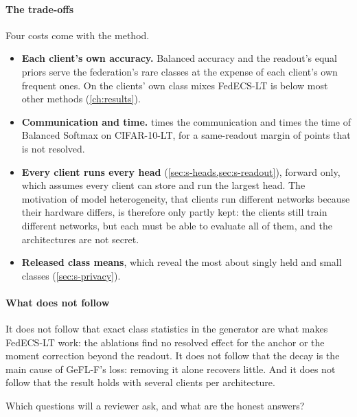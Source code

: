 \paragraph{The trade-offs} Four costs come with the method.
\begin{itemize}
\item \textbf{Each client's own accuracy.} Balanced accuracy and the readout's equal priors serve the federation's
rare classes at the expense of each client's own frequent ones. On the clients' own class mixes FedECS-LT is below
most other methods (\cref{ch:results}).
\item \textbf{Communication and time.}  times the communication and
 times the time of Balanced Softmax on CIFAR-10-LT, for a same-readout margin of
 points that is not resolved.
\item \textbf{Every client runs every head} (\cref{sec:s-heads,sec:s-readout}), forward only, which assumes every
client can store and run the largest head. The motivation of model heterogeneity, that clients run different networks
because their hardware differs, is therefore only partly kept: the clients still train different networks, but each
must be able to evaluate all of them, and the architectures are not secret.
\item \textbf{Released class means}, which reveal the most about singly held and small classes (\cref{sec:s-privacy}).
\end{itemize}

\paragraph{What does not follow} It does not follow that exact class statistics in the generator are what makes
FedECS-LT work: the ablations find no resolved effect for the anchor or the moment correction beyond the readout. It
does not follow that the decay is the main cause of GeFL-F's loss: removing it alone recovers little. And it does not
follow that the result holds with several clients per architecture.

Which questions will a reviewer ask, and what are the honest answers?
